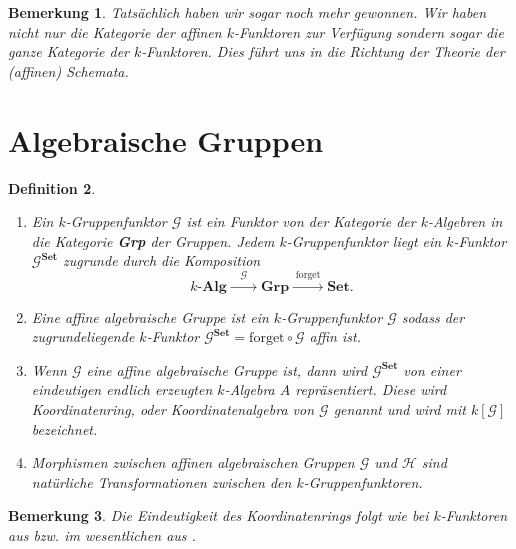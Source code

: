 \documentclass[a4paper, 11pt]{scrartcl}
\theoremstyle{basicstyle}
\newtheorem{definition}{Definition}[section]
\newtheorem{bemerkung}[definition]{Bemerkung}
\begin{document}
    \begin{bemerkung}
        Tatsächlich haben wir sogar noch mehr gewonnen.
        Wir haben nicht nur die Kategorie der affinen \(k\)-Funktoren zur Verfügung sondern sogar die ganze Kategorie der \(k\)-Funktoren.
        Dies führt uns in die Richtung der Theorie der (affinen) Schemata.
    \end{bemerkung}
    

    \section{Algebraische Gruppen}

    \begin{definition}
        \begin{enumerate}
            \item Ein \emph{\(k\)-Gruppenfunktor} \(\mathcal{G}\) ist ein Funktor von der Kategorie der \(k\)-Algebren in die Kategorie \textbf{Grp} der Gruppen.
                Jedem \(k\)-Gruppenfunktor liegt ein \(k\)-Funktor \(\mathcal{G}^{\textbf{Set}}\) zugrunde durch die Komposition
                \[k\textbf{-Alg} \xrightarrow{\quad \mathcal{G} \quad} \textbf{Grp} \xrightarrow{\;\text{forget}\;} \textbf{Set}.\]

            \item Eine \emph{affine algebraische Gruppe} ist ein \(k\)-Gruppenfunktor \(\mathcal{G}\) sodass der zugrundeliegende \(k\)-Funktor \(\mathcal{G}^{\textbf{Set}} = \text{forget} \circ \mathcal{G}\) affin ist.
            
            \item Wenn \(\mathcal{G}\) eine affine algebraische Gruppe ist, dann wird \(\mathcal{G}^{\textbf{Set}}\) von einer eindeutigen endlich erzeugten \(k\)-Algebra \(A\) repräsentiert.
                Diese wird \emph{Koordinatenring}, oder \emph{Koordinatenalgebra} von \(\mathcal{G}\) genannt und wird mit \(k[\mathcal{G}]\) bezeichnet.

            \item Morphismen zwischen affinen algebraischen Gruppen \(\mathcal{G}\) und \(\mathcal{H}\) sind natürliche Transformationen zwischen den \(k\)-Gruppenfunktoren.
        \end{enumerate}
    \end{definition}

    \begin{bemerkung}
        Die Eindeutigkeit des Koordinatenrings folgt wie bei \(k\)-Funktoren aus  bzw. im wesentlichen aus .
    \end{bemerkung}
\end{document}
